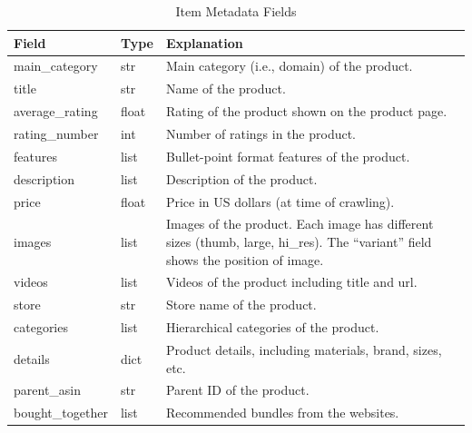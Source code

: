 \documentclass{article}
\begin{document}
\begin{table}[H]
      \centering
      \begin{tabular}{|l|l|p{8cm}|}
            \hline
            \textbf{Field}   & \textbf{Type} & \textbf{Explanation}
            \\ \hline
            main\_category   & str           & Main category (i.e., domain) of
            the
            product.
            \\ \hline
            title            & str           & Name of the product.
            \\ \hline
            average\_rating  & float         & Rating of the product shown on
            the
            product page.
            \\
            \hline
            rating\_number   & int           & Number of ratings in the
            product.
            \\ \hline
            features         & list          & Bullet-point format features of
            the
            product.
            \\ \hline
            description      & list          & Description of the product.
            \\ \hline
            price            & float         & Price in US dollars (at time of
            crawling).
            \\ \hline
            images           & list          & Images of the product. Each
            image
            has different sizes (thumb,
            large, hi\_res). The ``variant'' field shows the position of image.
            \\ \hline
            videos           & list          & Videos of the product including
            title and url.
            \\ \hline
            store            & str           & Store name of the product.
            \\ \hline
            categories       & list          & Hierarchical categories of the
            product.
            \\ \hline
            details          & dict          & Product details, including
            materials, brand, sizes, etc.
            \\
            \hline
            parent\_asin     & str           & Parent ID of the product.
            \\ \hline
            bought\_together & list          & Recommended bundles from the
            websites.
            \\ \hline
      \end{tabular}
      \caption{Item Metadata Fields}
      \label{table:item_metadata}
\end{table}
\end{document}
